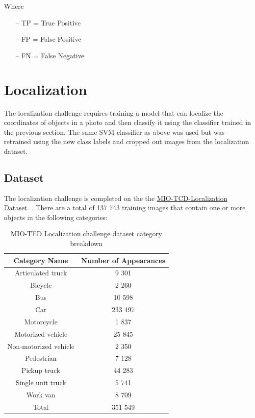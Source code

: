 \documentclass[12pt]{article}
\begin{document}
Where 
\begin{itemize}
    \item[--] TP = True Positive
    \item[--] FP = False Positive
    \item[--] FN = False Negative
\end{itemize}


\section{Localization}

The localization challenge requires training a model that can localize the coordinates of objects in a photo and then classify it using the classifier trained in the previous section. The same SVM classifier as above was used but was retrained using the new class labels and cropped out images from the localization dataset.

\subsection{Dataset}

The localization challenge is completed on the the \href{http://podoce.dinf.usherbrooke.ca/static/dataset/MIO-TCD-Localization.tar}{MIO-TCD-Localization Dataset}. \cite{MIO_TCD}. There are a total of 137 743 training images that contain one or more objects in the following categories: 

    \begin{table}[h] 
    \centering
        \begin{tabular}{ || c | c ||}
            \hline
            \hline
            Category Name           & Number of Appearances \\
            \hline
            Articulated truck       &  9 301 \\
            Bicycle                 &  2 260    \\
            Bus                     &  10 598  \\
            Car                     &  233 497 \\
            Motorcycle              &  1 837    \\
            Motorized vehicle       &  25 845 \\
            Non-motorized vehicle   &  2 350  \\
            Pedestrian              &  7 128  \\
            Pickup truck            &  44 283 \\
            Single unit truck       &  5 741  \\
            Work van                &  8 709  \\
            \hline
            Total                   & 351 549   \\
            \hline
            \hline
        \end{tabular}
    \caption{MIO-TED Localization challenge dataset category breakdown}
    \end{table}
\end{document}
